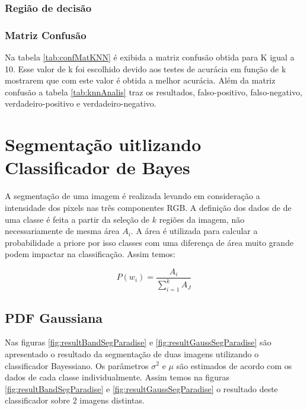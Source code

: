 \documentclass[ 
	article,			%
	11pt,				%
	oneside,			%
	a4paper,			%
	english,			%
	brazil,				%
	]{abntex2}
\begin{document}
\subsubsection{Região de decisão}

\subsubsection{Matriz Confusão}
Na tabela \ref{tab:confMatKNN} é exibida a matriz confusão obtida para K igual a
10. Esse valor de k foi escolhido devido aos testes de acurácia em
função de k mostrarem que com este valor é obtida a melhor acurácia. Além da
matriz confusão  a tabela \ref{tab:knnAnalis} traz os
resultados, falso-positivo, falso-negativo, verdadeiro-positivo e
verdadeiro-negativo. 


\section{Segmentação uitlizando Classificador de Bayes}
 A segmentação de uma imagem é realizada levando em
consideração a intensidade dos pixels nas três componentes RGB.
A definição dos dados de de uma classe é feita a partir da seleção de $k$
regiões da imagem, não necessariamente de mesma área $A_i$. A área é utilizada
para calcular a probabilidade a priore por isso classes com uma diferença de
área muito grande podem impactar na classificação.
Assim temos:

\begin{equation}
	P(w_i) =  \frac{A_i}{\sum_{i=1}^{k}{A_J}}
\end{equation}

\subsection{PDF Gaussiana}
Nas figuras \ref{fig:resultBandSegParadise} e \ref{fig:resultGaussSegParadise}
são apresentado o resultado da segmentação de duas imagens utilizando o
classificador Bayessiano. Os parâmetros $\sigma^2$ e $\mu$ são estimados de
acordo com os dados de cada classe individualmente. Assim temos na figuras
\ref{fig:resultBandSegParadise} e \ref{fig:resultGaussSegParadise} o resultado
deste classificador sobre 2 imagens distintas.
\end{document}
